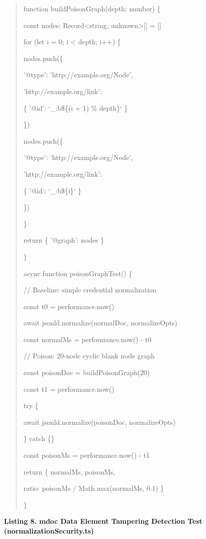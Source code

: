 \documentclass[conference]{IEEEtran}
\begin{document}
\begin{quote}
function buildPoisonGraph(depth: number) \{

const nodes: Record\textless string, unknown\textgreater{[}{]} = {[}{]}

for (let i = 0; i \textless{} depth; i++) \{

nodes.push(\{

'@type': 'http://example.org/Node',

'http://example.org/link':

\{ '@id': `\_:b\$\{(i + 1) \% depth\}` \}

\})

nodes.push(\{

'@type': 'http://example.org/Node',

'http://example.org/link':

\{ '@id': `\_:b\$\{i\}` \}

\})

\}

return \{ '@graph': nodes \}

\}

async function poisonGraphTest() \{

// Baseline: simple credential normalization

const t0 = performance.now()

await jsonld.normalize(normalDoc, normalizeOpts)

const normalMs = performance.now() - t0

// Poison: 20-node cyclic blank node graph

const poisonDoc = buildPoisonGraph(20)

const t1 = performance.now()

try \{

await jsonld.normalize(poisonDoc, normalizeOpts)

\} catch \{\}

const poisonMs = performance.now() - t1

return \{ normalMs, poisonMs,

ratio: poisonMs / Math.max(normalMs, 0.1) \}

\}
\end{quote}

\textbf{Listing 8. mdoc Data Element Tampering Detection Test (normalizationSecurity.ts)}
\end{document}
